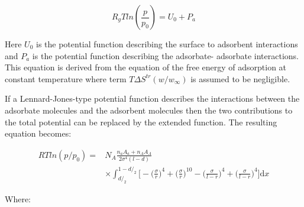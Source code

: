 \begin{equation}
    R_g T ln(\frac{p}{p_0}) = U_0 + P_a
\end{equation}

Here \(U_0\) is the potential function describing the surface to adsorbent
interactions and \(P_a\) is the potential function describing the adsorbate-
adsorbate interactions. This equation is derived from the equation of the free energy
of adsorption at constant temperature where term \(T \Delta S^{tr}(w/w_{\infty})\)
is assumed to be negligible.

If a Lennard-Jones-type potential function describes the interactions between the
adsorbate molecules and the adsorbent molecules then the two contributions to the
total potential can be replaced by the extended function. The resulting equation becomes:

\begin{align}
    RTln(p/p_0) =   & N_A\frac{n_a A_a + n_A A_A}{2 \sigma^{4}(l-d)} \\
                    & \times \int_{d/_2}^{1-d/_2}
                        \Big[
                        - \Big(\frac{\sigma}{r}\Big)^{4}
                        + \Big(\frac{\sigma}{r}\Big)^{10}
                        - \Big(\frac{\sigma}{l-r}\Big)^{4}
                        + \Big(\frac{\sigma}{l-r}\Big)^{4}
                        \Big] \mathrm{d}x
\end{align}

Where:

